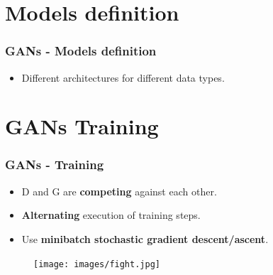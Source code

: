 \documentclass{beamer}
\begin{document}
\section{Models definition}

\begin{frame}
	\frametitle{GANs - Models definition}
	\begin{itemize}
		\item Different architectures for different data types.
		\begin{itemize}
		\end{itemize}
	\end{itemize}



\end{frame}

\section{GANs Training}

\begin{frame}
	\frametitle{GANs - Training}
	\begin{itemize}
		\item D and G are \textbf{competing} against each other.
		\item \textbf{Alternating} execution of training steps.
		\item Use \textbf{minibatch stochastic gradient descent/ascent}.
	\end{itemize}
	\begin{figure}
		\centering
		\texttt{[image: images/fight.jpg]}
	\end{figure}
\end{frame}
\end{document}
